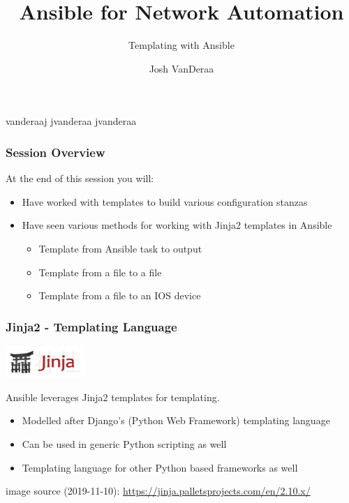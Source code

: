 \documentclass[aspectratio=169]{beamer}
\title{Ansible for Network Automation}
\subtitle{Templating with Ansible}
\date{}
\author{Josh VanDeraa}
\begin{document}
\begin{frame}
  \maketitle
  \footnotesize
  \faTwitter vanderaaj \hfill \faGithub jvanderaa \hfill \faSlack jvanderaa
\end{frame}

\begin{frame}
    \frametitle{Session Overview}
    At the end of this session you will:
    \begin{itemize}
      \item <2-> Have worked with templates to build various configuration stanzas
      \item <3-> Have seen various methods for working with Jinja2 templates in Ansible
      \begin{itemize}
          \item <3-> Template from Ansible task to output
          \item <4-> Template from a file to a file
          \item <5-> Template from a file to an IOS device
      \end{itemize}
    \end{itemize}
  \end{frame}

  \begin{frame}[t]
    \frametitle{Jinja2 - Templating Language}
      \begin{center}
        \includegraphics[width=3cm]{assets/jinja-logo.png}
      \end{center}
      Ansible leverages Jinja2 templates for templating.
      \begin{itemize}
          \item Modelled after Django's (Python Web Framework) templating language
          \item Can be used in generic Python scripting as well
          \item Templating language for other Python based frameworks as well
      \end{itemize}
      \tiny
      \vfill
      image source (2019-11-10): \url{https://jinja.palletsprojects.com/en/2.10.x/}
  \end{frame}
\end{document}
